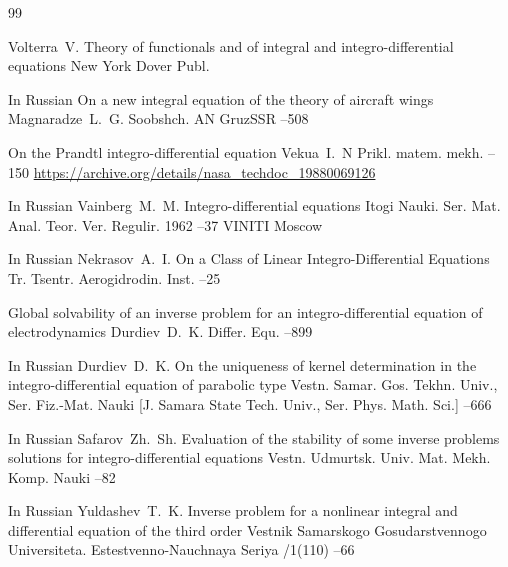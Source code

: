 {\newpage


\begin{thebibliography}{99}

\by Volterra~V.
\book Theory of functionals and of integral and integro-differential equations
\publaddr New York
\publ Dover Publ.

\lang In Russian
\paper On a new integral equation of the theory of aircraft wings
\by Magnaradze~L.~G.
\jour Soobshch. AN GruzSSR
--508

\paper On the Prandtl integro-differential equation
\by Vekua~I.~N
\jour Prikl. matem. mekh.
--150
\elink \url{https://archive.org/details/nasa_techdoc_19880069126}

\lang In Russian
\by Vainberg~M.~M.
\paper Integro-differential equations
\serial Itogi Nauki. Ser. Mat. Anal. Teor. Ver. Regulir. 1962
--37
\publ VINITI
\publaddr Moscow


\lang In Russian
\by Nekrasov~A.~I.
\paper On a Class of Linear Integro-Differential Equations
\jour  Tr. Tsentr. Aerogidrodin. Inst.
–25

\paper Global solvability of an inverse problem for an integro-differential equation of electrodynamics
\by Durdiev~D.~K.
\jour Differ. Equ.
--899

\lang In Russian
\by Durdiev~D.~K.
\paper On the uniqueness of kernel determination in the integro-differential equation of parabolic type
\jour Vestn. Samar. Gos. Tekhn. Univ., Ser. Fiz.-Mat. Nauki \rm [J. Samara State Tech. Univ., Ser. Phys. Math. Sci.]
--666



\lang In Russian
\by Safarov~Zh.~Sh.
\paper Evaluation of the stability of some inverse problems solutions for integro-differential equations
\jour Vestn. Udmurtsk. Univ. Mat. Mekh. Komp. Nauki
--82


\lang In Russian
\by Yuldashev~T.~K.
\paper Inverse problem for a nonlinear integral and differential equation of the third order
\jour Vestnik Samarskogo Gosudarstvennogo Universiteta. Estestvenno-Nauchnaya Seriya
/1(110)
--66


\end{thebibliography}}
